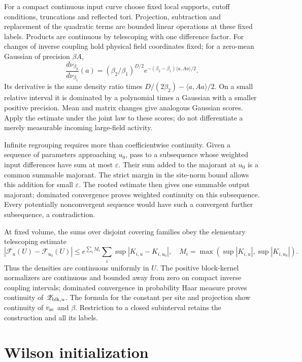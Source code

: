 For a compact continuous input curve choose fixed local
supports, cutoff conditions, truncations and reflected tori.
Projection, subtraction and replacement of the quadratic terms are bounded
linear operations at these fixed labels. Products are
continuous by telescoping with one difference factor.
For changes of inverse coupling hold physical field coordinates
fixed; for a zero-mean Gaussian of precision $\beta A$,
\[
 \frac{d\nu_{\beta_2}}{d\nu_{\beta_1}}(a)
  =(\beta_2/\beta_1)^{D/2}
             e^{-(\beta_2-\beta_1)\langle a,Aa\rangle/2}.
\]
Its derivative is the same density ratio times
$D/(2\beta_2)-\langle a,Aa\rangle/2$.
On a small relative interval it is dominated by a
polynomial times a Gaussian with a smaller positive
precision. Mean and matrix changes give analogous
Gaussian scores. Apply the estimate under the joint law to these
scores; do not differentiate a merely measurable incoming
large-field activity.

Infinite regrouping requires more than coefficientwise
continuity. Given a sequence of parameters approaching
$u_0$, pass to a subsequence whose weighted input
differences have sum at most $\varepsilon$.
Their sum added to the majorant at $u_0$ is a common
summable majorant. The strict margin in the site-norm bound allows
this addition for small $\varepsilon$.
The rooted estimate then gives one summable output majorant;
dominated convergence proves weighted continuity on this
subsequence. Every potentially nonconvergent sequence
would have such a convergent further subsequence, a
contradiction.

At fixed volume, the sums over disjoint covering families obey the elementary
telescoping estimate
\[
 |\mathcal F_u(U)-\mathcal F_{u_0}(U)|
 \le e^{\sum_i M_i}\sum_i\sup|K_{i,u}-K_{i,u_0}|,
 \quad M_i=\max(\sup|K_{i,u}|,\sup|K_{i,u_0}|).
\]
Thus the densities are continuous uniformly in $U$.
The positive block-kernel normalizers are continuous and
bounded away from zero on compact inverse coupling intervals;
dominated convergence in probability Haar measure proves
continuity of $\mathscr Z_{{\rm blk},u}$.
The formula for the constant per site and projection show continuity of
$v_{\rm sc}$ and $\beta$. Restriction to a closed
subinterval retains the construction and all its labels.

\section{Wilson initialization}
\label{ch09:wilson}

